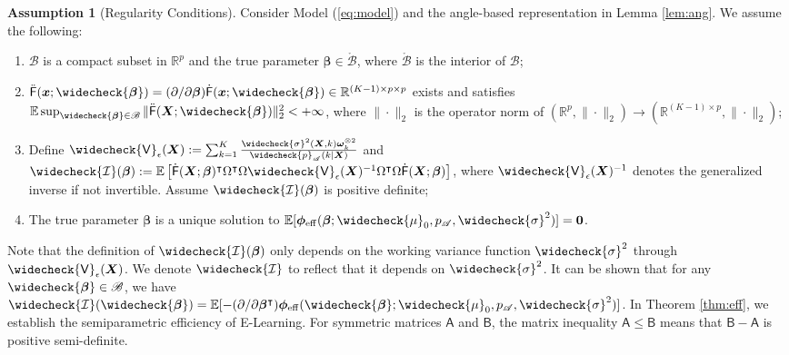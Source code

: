 \documentclass[11pt]{article}
\theoremstyle{definition}
\newtheorem{asm}{Assumption}
\theoremstyle{remark}
\newcommand{\bx}{\bm{x}}
\newcommand{\bX}{\bm{X}}
\newcommand{\bbeta}{\bm{\beta}}
\newcommand{\bomega}{\bm{\omega}}
\newcommand{\bphi}{\bm{\phi}}
\newcommand{\bbE}{\mathbb{E}}
\newcommand{\bbR}{\mathbb{R}}
\newcommand{\cI}{\mathcal{I}}
\newcommand{\sA}{\mathscr{A}}
\newcommand{\sB}{\mathscr{B}}
\newcommand{\sfA}{\mathsf{A}}
\newcommand{\sfB}{\mathsf{B}}
\newcommand{\sfF}{\mathsf{F}}
\newcommand{\sfV}{\mathsf{V}}
\newcommand{\bzero}{\mathbf{0}}	%
\newcommand{\eff}{\mathrm{eff}}
\begin{document}
\begin{asm}[Regularity Conditions]\label{asm:regular}
	Consider Model (\ref{eq:model}) and the angle-based representation in Lemma \ref{lem:ang}. We assume the following:
	\begin{enumerate}[label=\ref{asm:regular}.\arabic*]
		\item $ \sB $ is a compact subset in $ \bbR^{p} $ and the true parameter $ \bbeta \in \mathring{\sB} $, where $ \mathring{\sB} $ is the interior of $ \sB $;
		
		\item \label{enum:int} $ \ddot{\sfF}(\bx;\widecheck{\bbeta}) = (\partial/\partial\bbeta)\dot{\sfF}(\bx;\widecheck{\bbeta}) \in \bbR^{(K-1) \times p \times p} $ exists and satisfies $ \bbE\sup_{\widecheck{\bbeta} \in \sB}\| \ddot{\sfF}(\bX;\widecheck{\bbeta}) \|_{2}^{2} < +\infty $, where $ \| \cdot \|_{2} $ is the operator norm of $ (\bbR^{p},\| \cdot \|_{2}) \to (\bbR^{(K-1)\times p},\| \cdot \|_{2}) $;
		
		\item \label{enum:curv} Define $ \widecheck{\sfV}_{\epsilon}(\bX) := \sum_{k=1}^{K}{\widecheck{\sigma}^{2}(\bX,k)\bomega_{k}^{\otimes 2} \over \widecheck{p}_{\sA}(k|\bX)} $ and $ \widecheck{\cI}(\bbeta) := \bbE\left[ \dot{\sfF}(\bX;\bbeta)^{\intercal}\Omega^{\intercal}\Omega\widecheck{\sfV}_{\epsilon}(\bX)^{-1}\Omega^{\intercal}\Omega\dot{\sfF}(\bX;\bbeta) \right] $, where $ \widecheck{\sfV}_{\epsilon}(\bX)^{-1} $ denotes the generalized inverse if not invertible. Assume $ \widecheck{\cI}(\bbeta) $ is positive definite;
		
		\item \label{enum:unique} The true parameter $ \bbeta $ is a unique solution to $ \bbE[\bphi_{\eff}(\bbeta;\widecheck{\mu}_{0},p_{\sA},\widecheck{\sigma}^{2})] = \bzero $.
	\end{enumerate}
\end{asm}
Note that the definition of $ \widecheck{\cI}(\bbeta) $ only depends on the working variance function $ \widecheck{\sigma}^{2} $ through $ \widecheck{\sfV}_{\epsilon}(\bX) $. We denote $ \widecheck{\cI} $ to reflect that it depends on $ \widecheck{\sigma}^{2} $. It can be shown that for any $ \widecheck{\bbeta} \in \sB $, we have $ \widecheck{\cI}(\widecheck{\bbeta}) = \bbE[-(\partial/\partial \bbeta^{\intercal}) \bphi_{\eff}(\widecheck{\bbeta};\widecheck{\mu}_{0},p_{\sA},\widecheck{\sigma}^{2})] $. In Theorem \ref{thm:eff}, we establish the semiparametric efficiency of E-Learning. For symmetric matrices $ \sfA $ and $ \sfB $, the matrix inequality $ \sfA \le \sfB $ means that $ \sfB - \sfA $ is positive semi-definite.
\end{document}
